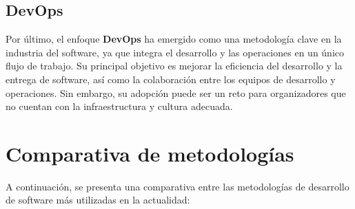 \subsection{DevOps}
\label{subsec:devops}
Por último, el enfoque \textbf{DevOps} ha emergido como una metodología clave en la industria del software, ya que integra el desarrollo y las operaciones
en un único flujo de trabajo. Su principal objetivo es mejorar la eficiencia del desarrollo y la entrega de software, así como la colaboración entre los equipos de desarrollo y operaciones.
Sin embargo, su adopción puede ser un reto para organizadores que no cuentan con la infraestructura y cultura adecuada. \cite{kim2016}

\newpage

\section{Comparativa de metodologías}
\label{sec:comparativa_metodologias}

A continuación, se presenta una comparativa entre las metodologías de desarrollo de software más utilizadas en la actualidad:

\begin{table}[H]
    \centering
    \renewcommand{\arraystretch}{1.5}
    \caption{Comparativa de metodologías de desarrollo de software.}
    \label{tab:comparativa_metodologias}
\end{table}


